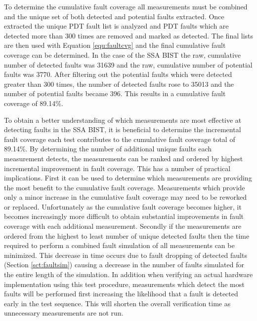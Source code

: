 \documentclass[12pt]{report}
\begin{document}
To determine the cumulative fault coverage all measurements must be combined and the unique set of both detected and potential faults extracted.  Once extracted the unique PDT fault list is analyzed and PDT faults which are detected more than 300 times are removed and marked as detected.  The final lists are then used with Equation \ref{equ:faultcvg} and the final cumulative fault coverage can be determined.  In the case of the SSA BIST the raw, cumulative number of detected faults was 31639 and the raw, cumulative number of potential faults was 3770.  After filtering out the potential faults which were detected greater than 300 times, the number of detected faults rose to 35013 and the number of potential faults became 396.  This results in a cumulative fault coverage of 89.14\%.  

To obtain a better understanding of which measurements are most effective at detecting faults in the SSA BIST, it is beneficial to determine the incremental fault coverage each test contributes to the cumulative fault coverage total of 89.14\%.  By determining the number of additional unique faults each measurement detects, the measurements can be ranked and ordered by highest incremental improvement in fault coverage.  This has a number of practical implications.  First it can be used to determine which measurements are providing the most benefit to the cumulative fault coverage.  Measurements which provide only a minor increase in the cumulative fault coverage may need to be reworked or replaced.  Unfortunately as the cumulative fault coverage becomes higher, it becomes increasingly more difficult to obtain substantial improvements in fault coverage with each additional measurement.  Secondly if the measurements are ordered from the highest to least number of unique detected faults then the time required to perform a combined fault simulation of all measurements can be minimized.  This decrease in time occurs due to fault dropping of detected faults (Section \ref{sct:faultsim}) causing a decrease in the number of faults simulated for the entire length of the simulation.  In addition when verifying an actual hardware implementation using this test procedure, measurements which detect the most faults will be performed first increasing the likelihood that a fault is detected early in the test sequence.  This will shorten the overall verification time as unnecessary measurements are not run.
\end{document}

